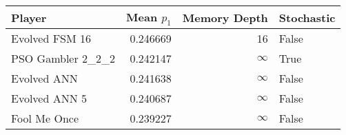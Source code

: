 \begin{tabular}{lrrl}
\toprule
            Player &  Mean $p_1$ &  Memory Depth & Stochastic \\
\midrule
    Evolved FSM 16 &    0.246669 &            16 &      False \\
 PSO Gambler 2\_2\_2 &    0.242147 &            \(\infty\) &       True \\
       Evolved ANN &    0.241638 &            \(\infty\) &      False \\
     Evolved ANN 5 &    0.240687 &            \(\infty\) &      False \\
      Fool Me Once &    0.239227 &            \(\infty\) &      False \\
\bottomrule
\end{tabular}
